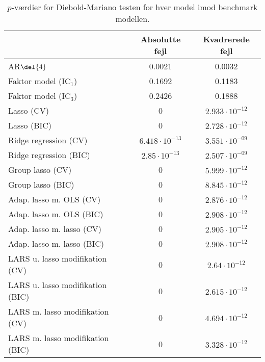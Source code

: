 \begin{table}[ht]
\center
\begin{tabular}{lcc}
\toprule
 & Absolutte fejl & Kvadrerede fejl \\ \midrule
AR\(\del{4}\) & 0.0021 & 0.0032 \\  
Faktor model (IC\(_1\)) & 0.1692 & 0.1183 \\
Faktor model (IC\(_3\)) & 0.2426 & 0.1888 \\
Lasso (CV) & 0 & $2.933\cdot 10^{-12}$ \\
Lasso (BIC) & 0 & $2.728 \cdot 10^{-12}$ \\
Ridge regression (CV) & $6.418 \cdot 10^{-13}$  & $3.551\cdot 10 ^{-09}$  \\
Ridge regression (BIC) &$ 2.85 \cdot 10^{-13} $& $2.507\cdot 10 ^{-09}$\\
Group lasso (CV) & 0 &$ 5.999 \cdot 10^{-12}$  \\
Group lasso (BIC) & 0& $8.845 \cdot 10^{-12}$ \\
Adap. lasso m. OLS (CV) & 0& $2.876 \cdot 10^{-12} $\\
Adap. lasso m. OLS (BIC) & 0& $2.908\cdot 10^{-12}$\\
Adap. lasso m. lasso (CV) & 0 & $2.905\cdot 10^{-12} $\\
Adap. lasso m. lasso (BIC) & 0& $2.908\cdot 10^{-12}$\\
LARS u. lasso modifikation (CV) & 0 & $2.64\cdot 10^{-12}$  \\
LARS u. lasso modifikation (BIC) & 0& $2.615\cdot 10^{-12}$ \\
LARS m. lasso modifikation (CV) & 0& $4.694\cdot 10^{-12} $ \\
LARS m. lasso modifikation (BIC) & 0& $3.328\cdot 10^{-12 }$ \\ \bottomrule
\end{tabular}
\caption{\(p\)-værdier for Diebold-Mariano testen for hver model imod benchmark modellen.} \label{tab:dm_test}
\end{table}
